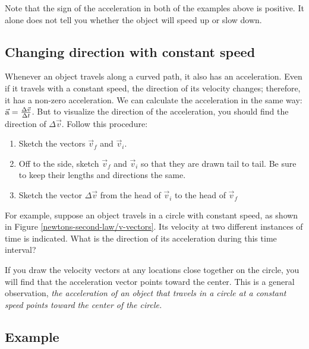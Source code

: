 \bigskip
Note that the sign of the acceleration in both of the examples above is positive. It alone does not tell you whether the object will speed up or slow down.

\subsection*{Changing direction with constant speed}

Whenever an object travels along a curved path, it also has an acceleration. Even if it travels with a constant speed, the direction of its velocity changes; therefore, it has a non-zero acceleration.  We can calculate the acceleration in the same way: $\vec{\mathrm{a}} = \frac{\Delta \vec{v}}{\Delta t}$. But to visualize the direction of the acceleration, you should find the direction of $\Delta \vec{v}$. Follow this procedure:

\begin{enumerate}
	\item Sketch the vectors $\vec{v}_f$ and $\vec{v}_i$.
	\item Off to the side, sketch $\vec{v}_f$ and $\vec{v}_i$ so that they are drawn tail to tail. Be sure to keep their lengths and directions the same.
	\item Sketch the vector $\Delta \vec{v}$ from the head of $\vec{v}_i$ to the head of $\vec{v}_f$
\end{enumerate}

For example, suppose an object travels in a circle with constant speed, as shown in Figure \ref{newtons-second-law/v-vectors}. Its velocity at two different instances of time is indicated. What is the direction of its acceleration during this time interval?


If you draw the velocity vectors at any locations close together on the circle, you will find that the acceleration vector points toward the center. This is a general observation, \emph{the acceleration of an object that travels in a circle at a constant speed points toward the center of the circle.}

\subsection*{Example}

